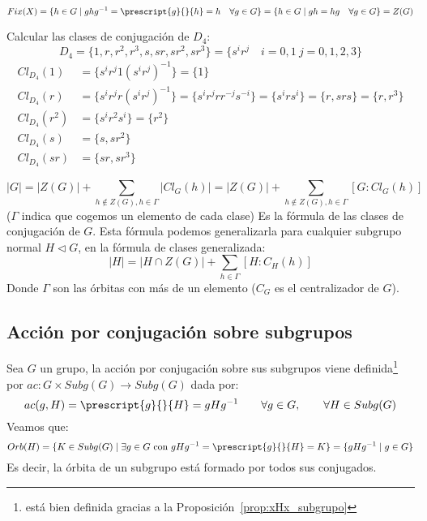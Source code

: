 \begin{equation*}
    Fix(X) = \{h\in G \mid ghg^{-1} = \prescript{g}{}{h} = h \quad \forall g\in G\} = \{h\in G\mid gh = hg \quad \forall g\in G\} = Z(G)
\end{equation*}

\begin{ejemplo}
    Calcular las clases de conjugación de $D_4$:
    \begin{equation*}
        D_4 = \{1,r,r^2, r^3, s, sr, sr^2, sr^3\} = \{s^i r^j \quad i = 0,1\ j = 0,1,2,3\}
    \end{equation*}
    \begin{align*}
        Cl_{D_4}(1) &= \{s^ir^j 1 {(s^i r^j)}^{-1}\} = \{1\} \\
        Cl_{D_4}(r) &= \{s^ir^j r {(s^i r^j)}^{-1}\} = \{s^i r^j rr^{-j}s^{-i}\} = \{s^i r s^{i}\} = \{r, srs\} = \{r,r^3\} \\ %
        Cl_{D_4}(r^2) &= \{s^i r^2 s^i\} = \{r^2\} \\
        Cl_{D_4}(s) &= \{s,sr^2\} \\
        Cl_{D_4}(sr) &= \{sr,sr^3\} 
    \end{align*}
\end{ejemplo}


\begin{equation*}
    |G| = |Z(G)| + \sum_{h\notin Z(G), h\in \Gamma}|Cl_G(h)| = |Z(G)| + \sum_{h\notin Z(G), h\in \Gamma} [G:Cl_G(h)]
\end{equation*}
($\Gamma$ indica que cogemos un elemento de cada clase)
Es la fórmula de las clases de conjugación de $G$. Esta fórmula podemos generalizarla para cualquier subgrupo normal $H\lhd G$, en la fórmula de clases generalizada:
\begin{equation*}
    |H| = |H\cap Z(G)| + \sum_{h\in \Gamma} [H:C_H(h)]
\end{equation*}
Donde $\Gamma$ son las órbitas con más de un elemento ($C_G$ es el centralizador de $G$).

\subsection{Acción por conjugación sobre subgrupos}
\noindent
Sea $G$ un grupo, la acción por conjugación sobre sus subgrupos viene definida\footnote{está bien definida gracias a la Proposición~\ref{prop:xHx_subgrupo}} por $ac:G\times Subg(G)\to Subg(G)$ dada por:
\begin{equation*}
    ac(g,H) = \prescript{g}{}{H} = gHg^{-1} \qquad \forall g\in G, \qquad \forall H\in Subg(G)
\end{equation*}
Veamos que:
\begin{equation*}
    Orb(H) = \{K\in Subg(G) \mid \exists g\in G \text{\ con\ } gHg^{-1} = \prescript{g}{}{H} = K \} = \{gHg^{-1} \mid g\in G\}
\end{equation*}
Es decir, la órbita de un subgrupo está formado por todos sus conjugados.

